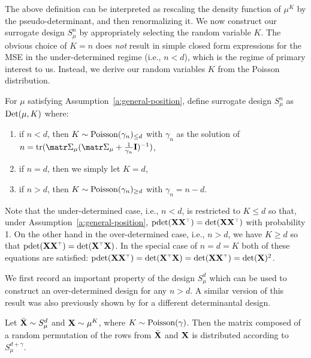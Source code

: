 \documentclass[../../thesis.tex]{subfiles}
\begin{document}
\noindent
The above definition can be
interpreted as rescaling the density function of $\mu^K$ by the
pseudo-determinant, and then renormalizing it.
We now construct our surrogate design $S_\mu^n$ by appropriately
selecting the random variable $K$.
The obvious choice of $K=n$ does \emph{not} result in simple closed
form expressions for the MSE in the under-determined regime (i.e.,
$n<d$), which is the regime of primary interest to us.
Instead, we derive our random variables $K$ from the Poisson
distribution.
\begin{definition}\label{d:surrogate}
  For $\mu$ satisfying Assumption~\ref{a:general-position},
  define surrogate design $S_\mu^n$ as ${\mathrm{Det}}(\mu,K)$ where:
  \vspace{-2mm}
  \begin{enumerate}
    \item if $n<d$, then $K\sim {\operatorname{Poisson}}(\gamma_n)_{\leq d}$ with
          $\gamma_n$ as the solution of
          $n=\tr(\Sigmab_\mu(\Sigmab_\mu+\frac1{\gamma_n}\I)^{-1})$,
          \vspace{-2mm}
    \item if $n=d$, then we simply let $K=d$,
          \vspace{-2mm}
    \item if $n>d$, then $K\sim{\operatorname{Poisson}}(\gamma_n)_{\geq d}$ with $\gamma_n=n-d$.
  \end{enumerate}
\end{definition}

\noindent
Note that the under-determined case, i.e., $n<d$, is restricted to $K\leq d$ so that, under Assumption~\ref{a:general-position}, $\pdet(\X\X^\top)=\det(\X\X^\top)$ with probability 1.
On the other hand in the over-determined case, i.e., $n>d$, we have
$K\geq d$ so that $\pdet(\X\X^\top)=\det(\X^\top\X)$. In the special case
of $n=d=K$ both of these equations are satisfied: $\pdet(\X\X^\top)=\det(\X^\top\X)=\det(\X\X^\top)=\det(\X)^2$.

We first record an important property of the design $S_\mu^d$
which can be used to construct an over-determined design for any $n>d$. A similar
version of this result was also previously shown by
\cite{correcting-bias-journal} for a different determinantal design.

\begin{lemma}\label{l:decomposition}
  Let ${\bar{\mathbf X}}\sim S_\mu^d$ and $\mathbf X\sim \mu^K$, where
  $K\sim{\operatorname{Poisson}}(\gamma)$. Then the matrix composed of a random
  permutation of the rows from ${\bar{\mathbf X}}$ and $\mathbf X$ is distributed according to
  $S_\mu^{d+\gamma}$.
\end{lemma}
\end{document}

